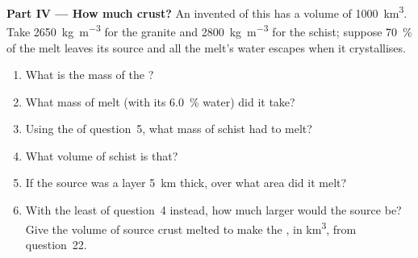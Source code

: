 \begin{problem}
\noindent\textbf{Part IV --- How much crust?}
An invented  of this  has a volume of \qty{1000}{\cubic\kilo\metre}.
Take \qty{2650}{\kilogram\per\cubic\metre} for the granite and
\qty{2800}{\kilogram\per\cubic\metre} for the schist; suppose \qty{70}{\percent} of the
melt leaves its source and all the melt's water escapes when it crystallises.
\begin{enumerate}[resume]
\item What is the mass of the ?
\item What mass of melt (with its \qty{6.0}{\percent} water) did it take?
\item Using the  of question~5, what mass of schist had to melt?
\item What volume of schist is that?
\item If the source was a layer \qty{5}{km} thick, over what area did it melt?
\item With the least  of question~4 instead, how much larger would the
source be? Give the volume of source crust melted to make the , in
\unit{\cubic\kilo\metre}, from question~22.
\end{enumerate}
\end{problem}
